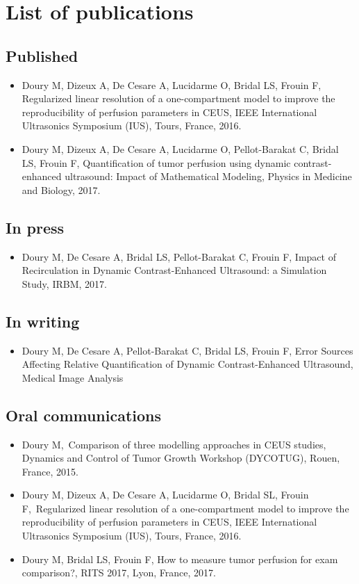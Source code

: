 \chapter*{List of publications}

\section*{Published}
\begin{itemize}
\item Doury M, Dizeux A, De Cesare A, Lucidarme O, Bridal LS, Frouin F, Regularized linear resolution of a one-compartment model to improve the reproducibility of perfusion parameters in CEUS, IEEE International Ultrasonics Symposium (IUS), Tours, France, 2016.
\item Doury M, Dizeux A, De Cesare A, Lucidarme O, Pellot-Barakat C, Bridal LS, Frouin F, Quantification of tumor perfusion using dynamic contrast-enhanced ultrasound: Impact of Mathematical Modeling, Physics in Medicine and Biology, 2017.
\end{itemize}

\section*{In press}
\begin{itemize}
\item Doury M, De Cesare A, Bridal LS, Pellot-Barakat C, Frouin F, Impact of Recirculation in Dynamic Contrast-Enhanced Ultrasound: a Simulation Study, IRBM, 2017.
\end{itemize}

\section*{In writing}
\begin{itemize}
\item Doury M, De Cesare A, Pellot-Barakat C, Bridal LS, Frouin F, Error Sources Affecting Relative Quantification of Dynamic Contrast-Enhanced Ultrasound, Medical Image Analysis
\end{itemize}

\section*{Oral communications}
\begin{itemize}
\item Doury M, Comparison of three modelling approaches in CEUS studies, Dynamics and Control of Tumor Growth Workshop (DYCOTUG), Rouen, France, 2015.
\item Doury M, Dizeux A, De Cesare A, Lucidarme O, Bridal SL, Frouin F, Regularized linear resolution of a one-compartment model to improve the reproducibility of perfusion parameters in CEUS, IEEE International Ultrasonics Symposium (IUS), Tours, France, 2016.
\item Doury M, Bridal LS, Frouin F, How to measure tumor perfusion for exam comparison?, RITS 2017, Lyon, France, 2017.
\end{itemize}

